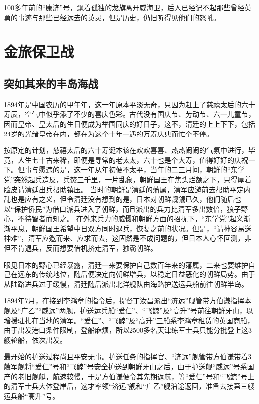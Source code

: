 \documentclass[12pt,UTF8]{ctexbook}
\begin{document}
100多年前的“康济”号，飘着孤独的龙旗离开威海卫，后人已经记不起那些曾经英勇的事迹与那些已经远去的英灵，但是历史，仍旧听得见他们的怒吼。

\mainmatter

\part{金旅保卫战}

\chapter{突如其来的丰岛海战}

1894年是中国农历的甲午年，这一年原本平淡无奇，只因为赶上了慈禧太后的六十寿辰，空气中似乎添了不少的喜庆色彩。古代没有国庆节、劳动节、六一儿童节，因而皇帝、皇太后的生日便成为举国同庆的好日子，这不，清廷的上上下下，包括24岁的光绪皇帝在内，都在为这个十年一遇的万寿庆典而忙个不停。

按原定的计划，慈禧太后的六十寿诞本该在欢欢喜喜、热热闹闹的气氛中进行，毕竟，人生七十古来稀，即便是寻常的老太太，六十也是个大寿，值得好好的庆祝一下。但事与愿违的是，这一年从年初便不太平，当年的二三月间，朝鲜的“东学党”突然起兵造反，兵焚三千里，一片乱象，朝鲜国王在焦头烂额之下，只得厚着脸皮请清廷出兵帮助镇压。
当时的朝鲜是清廷的藩属，清军应邀前去帮助平定内乱也是应有之义，但令清廷没有想到的是，日本对朝鲜觊觎已久，他们随后也以“保护侨民”为借口派兵进入了朝鲜，而且派出的兵力比清军多出数倍，狼子野心，不待智者而知之。
在外来兵力的威慑和朝鲜方面的招抚下，“东学党”起义渐渐平息，朝鲜国王希望中日双方同时退兵，恢复之前的状况。但是，“请神容易送神难”，清军应邀而来、应求而去，这固然是不成问题的，但日本人心怀叵测，非但不肯退兵，反而想要借机挤走清军，独霸朝鲜。

眼见日本的野心已经暴露，清廷一来要保护自己数百年来的藩属，二来也要维护自己在远东的传统地位，随后便决定向朝鲜增兵，以稳定日益恶化的朝鲜局势。由于从陆路进兵过于缓慢，清廷随后派出北洋舰队由海路护送运兵船前往朝鲜半岛。

1894年7月，在接到李鸿章的指令后，提督丁汝昌派出“济远”舰管带方伯谦指挥本舰及“广乙”“威远”两舰，护送运兵船“爱仁”、“飞鲸”及“高升”号前往朝鲜牙山，以增援驻扎在当地的清军。“爱仁”、“飞鲸”及“高升”三船系李鸿章租赁的英国商船，由于出发港口条件限制，登船麻烦，所以2500多名天津练军士兵只能分批登上这3艘轮船，依次出发。

最开始的护送过程尚且平安无事。护送任务的指挥官、“济远”舰管带方伯谦带着3艘军舰将“爱仁”号和“飞鲸”号安全护送到朝鲜牙山之后，由于护送舰“威远”号系国产的老旧舰艇，航速较慢，于是方伯谦便令其先期返航，等“爱仁”号和“飞鲸”号上的清军士兵大体登岸后，这才率领“济远”舰和“广乙”舰沿途返回，准备去接第三艘运兵船“高升”号。
\end{document}
